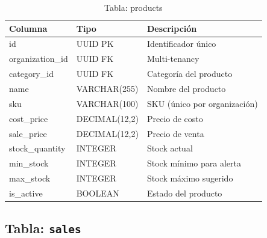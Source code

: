 \begin{longtable}[]{@{}
  >{\raggedright\arraybackslash}p{}
  >{\raggedright\arraybackslash}p{}
  >{\raggedright\arraybackslash}p{}@{}}
\caption[Tabla: products]{Tabla: products}\tabularnewline
\toprule\noalign{}
\begin{minipage}[b]{\linewidth}\raggedright
Columna
\end{minipage} & \begin{minipage}[b]{\linewidth}\raggedright
Tipo
\end{minipage} & \begin{minipage}[b]{\linewidth}\raggedright
Descripción
\end{minipage} \\
\midrule\noalign{}
\endhead
\bottomrule\noalign{}
\endlastfoot
id & UUID PK & Identificador único \\
organization\_id & UUID FK & Multi-tenancy \\
category\_id & UUID FK & Categoría del producto \\
name & VARCHAR(255) & Nombre del producto \\
sku & VARCHAR(100) & SKU (único por organización) \\
cost\_price & DECIMAL(12,2) & Precio de costo \\
sale\_price & DECIMAL(12,2) & Precio de venta \\
stock\_quantity & INTEGER & Stock actual \\
min\_stock & INTEGER & Stock mínimo para alerta \\
max\_stock & INTEGER & Stock máximo sugerido \\
is\_active & BOOLEAN & Estado del producto \\
\end{longtable}

\subsection{\texorpdfstring{Tabla: \texttt{sales}}{Tabla: sales}}\label{tabla-sales}

